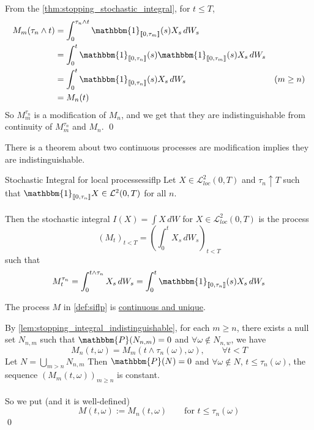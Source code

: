 \documentclass[12pt,a4paper]{article}
\renewenvironment{proof}
    {\begin{trivlist}\item[\hskip\labelsep\color{blue}\bfseries Proof:]}
    {\qed\end{trivlist}}
\begin{document}
\begin{proof}
    From the \autoref{thm:stopping_stochastic_integral}, for $t\le T$,
    \begin{align*}
         M_m(\tau_n\wedge t) &= \int_0^{\tau_n\wedge t} \mathbbm{1}_{\llbracket 0,\tau_m\rrbracket}(s) X_s\,dW_s\\
         &= \int_0^t \mathbbm{1}_{\llbracket 0,\tau_n\rrbracket}(s)\mathbbm{1}_{\llbracket 0,\tau_m\rrbracket}(s) X_s\, dW_s\\
         &= \int_0^t \mathbbm{1}_{\llbracket 0,\tau_n \rrbracket} (s) X_s\,dW_s & (m\ge n)\\
         &= M_n(t)
    \end{align*}
    So $M_m^{\tau_n}$ is a modification of $M_n$, and we get that they are indistinguishable from continuity of $M_m^{\tau_n}$ and $M_n$.
\end{proof}
\begin{remark}{}{}
    There is a theorem about two continuous processes are modification implies they are indistinguishable.
\end{remark}
\pagebreak
\begin{definition}{Stochastic Integral for local processes}{siflp}
    Let $X\in \mathcal{L}^2_{loc}(0,T)$ and $\tau_n\uparrow T$ such that $\mathbbm{1}_{\llbracket 0,\tau_n\rrbracket} X\in\mathcal{L}^2(0,T)$ for all $n$.\\
    \\
    Then the stochastic integral $I(X) = \int X\, dW$ for $X\in \mathcal{L}^2_{loc}(0,T)$ is the process 
    $$
    (M_t)_{t<T} = \left(\int_0^t X_s\, dW_s\right)_{t<T}
    $$
    such that
    $$
    M_t^{\tau_n} = \int_0^{t\wedge\tau_n} X_s\, dW_s = \int_0^t \mathbbm{1}_{\llbracket 0,\tau_n\rrbracket} (s)X_s\, dW_s
    $$
\end{definition}
\begin{proposition}{}{}
    The process $M$ in \autoref{def:siflp} is \underline{continuous and unique}.
\end{proposition}
\begin{proof}
    By \autoref{lem:stopping_integral_indistinguishable}, for each $m\ge n$, there exists a null set $N_{n,m}$ such that $\mathbbm{P}(N_{n,m})=0$ and $\forall \omega \not\in N_{n,w}$, we have
    $$
    M_n(t,\omega) = M_m(t\wedge \tau_n(\omega),\omega),\qquad \forall t<T
    $$
    Let $N = \bigcup_{m>n} N_{n,m}$ Then $\mathbbm{P}(N) = 0$ and $\forall \omega\not\in N$, $t\le \tau_n(\omega)$, the sequence $(M_m(t,\omega))_{m\ge n}$ is constant.\\
    \\
    So we put (and it is well-defined)
    $$
    M(t,\omega):=M_n(t,\omega) \qquad\text{for $t\le \tau_n(\omega)$}
    $$
\end{proof}
\end{document}
